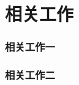 \section{相关工作}

\begin{frame}
\frametitle{相关工作一}
\end{frame}

\begin{frame}
\frametitle{相关工作二}
\end{frame}

